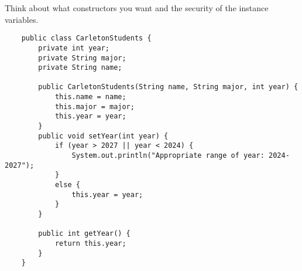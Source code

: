 \documentclass[letter]{article}
\begin{document}
\begin{enumerate}[1.]
     Think about what constructors you want and the security of the instance variables.

    \begin{verbatim}
    public class CarletonStudents {
        private int year;
        private String major;
        private String name;

        public CarletonStudents(String name, String major, int year) {
            this.name = name;
            this.major = major;
            this.year = year;
        }
        public void setYear(int year) {
            if (year > 2027 || year < 2024) {
                System.out.println("Appropriate range of year: 2024-2027");
            }
            else {
                this.year = year;
            }
        }

        public int getYear() {
            return this.year;
        }
    }
    \end{verbatim}
    

\end{enumerate}
\end{document}
